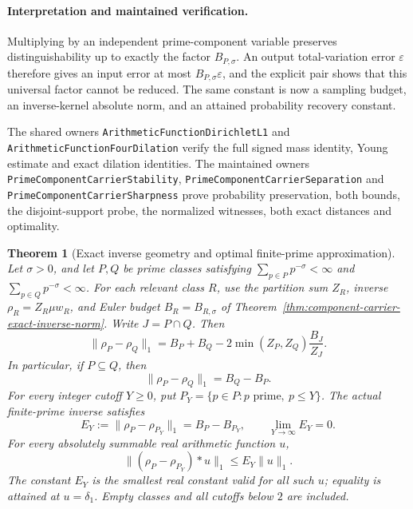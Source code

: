 \documentclass[11pt]{article}
\newtheorem{theorem}{Theorem}[section]
\theoremstyle{definition}
\begin{document}
\paragraph{Interpretation and maintained verification.}
Multiplying by an independent prime-component variable preserves
distinguishability up to exactly the factor \(B_{P,\sigma}\).
An output total-variation error \(\varepsilon\) therefore gives an
input error at most \(B_{P,\sigma}\varepsilon\), and the explicit
pair shows that this universal factor cannot be reduced.
The same constant is now a sampling budget, an inverse-kernel
absolute norm, and an attained probability recovery constant.

The shared owners \texttt{ArithmeticFunctionDirichletL1} and
\texttt{ArithmeticFunctionFourDilation} verify the full signed
mass identity, Young estimate and exact dilation identities.
The maintained owners \texttt{PrimeComponentCarrierStability},
\texttt{PrimeComponentCarrierSeparation} and
\texttt{PrimeComponentCarrierSharpness} prove probability
preservation, both bounds, the disjoint-support probe, the
normalized witnesses, both exact distances and optimality.

\begin{theorem}[Exact inverse geometry and optimal finite-prime approximation]
\label{thm:component-carrier-exact-geometry}
Let \(\sigma>0\), and let \(P,Q\) be prime classes satisfying
\(\sum_{p\in P}p^{-\sigma}<\infty\) and
\(\sum_{p\in Q}p^{-\sigma}<\infty\).
For each relevant class \(R\), use the partition sum \(Z_R\),
inverse \(\rho_R=Z_R\mu w_R\), and Euler budget
\(B_R=B_{R,\sigma}\) of
Theorem~\ref{thm:component-carrier-exact-inverse-norm}.
Write \(J=P\cap Q\). Then
\[
 \|\rho_P-\rho_Q\|_1
   =B_P+B_Q-2\min(Z_P,Z_Q)\frac{B_J}{Z_J}.
\]
In particular, if \(P\subseteq Q\), then
\[
                  \|\rho_P-\rho_Q\|_1=B_Q-B_P.
\]
For every integer cutoff \(Y\ge0\), put
\(P_Y=\{p\in P:p\text{ prime},\ p\le Y\}\).
The actual finite-prime inverse satisfies
\[
 E_Y:=\|\rho_P-\rho_{P_Y}\|_1=B_P-B_{P_Y},
 \qquad \lim_{Y\to\infty}E_Y=0.
\]
For every absolutely summable real arithmetic function \(u\),
\[
 \|(\rho_P-\rho_{P_Y})*u\|_1\le E_Y\|u\|_1.
\]
The constant \(E_Y\) is the smallest real constant valid for all
such \(u\); equality is attained at \(u=\delta_1\).
Empty classes and all cutoffs below \(2\) are included.
\end{theorem}
\end{document}
